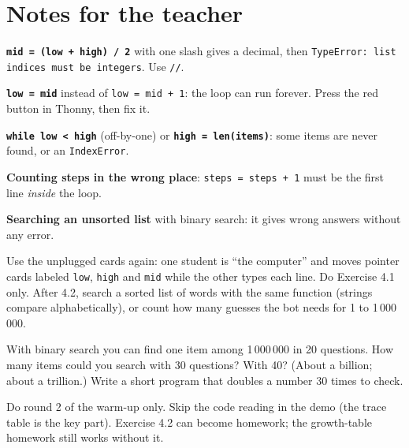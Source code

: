 \section{Notes for the teacher}
\begin{commonmistakes}
  \item \textbf{\texttt{mid = (low + high) / 2}} with one slash gives a decimal, then \texttt{TypeError: list indices must be integers}. Use \texttt{//}.
  \item \textbf{\texttt{low = mid}} instead of \texttt{low = mid + 1}: the loop can run forever. Press the red  button in Thonny, then fix it.
  \item \textbf{\texttt{while low < high}} (off-by-one) or \textbf{\texttt{high = len(items)}}: some items are never found, or an \texttt{IndexError}.
  \item \textbf{Counting steps in the wrong place}: \texttt{steps = steps + 1} must be the first line \emph{inside} the loop.
  \item \textbf{Searching an unsorted list} with binary search: it gives wrong answers without any error.
\end{commonmistakes}

\begin{differentiation}
\supportpath Use the unplugged cards again: one student is \enquote{the computer} and moves pointer cards labeled \texttt{low}, \texttt{high} and \texttt{mid} while the other types each line. Do Exercise 4.1 only.
\extensionpath After 4.2, search a sorted list of words with the same function (strings compare alphabetically), or count how many guesses the bot needs for 1 to 1\,000\,000.
\end{differentiation}

\begin{stretchchallenge}
With binary search you can find one item among 1\,000\,000 in 20 questions. How many items could you search with 30 questions? With 40? (About a billion; about a trillion.) Write a short program that doubles a number 30 times to check.
\end{stretchchallenge}

\begin{teachernote}
Do round 2 of the warm-up only. Skip the code reading in the demo (the trace table is the key part). Exercise 4.2 can become homework; the growth-table homework still works without it.
\end{teachernote}
